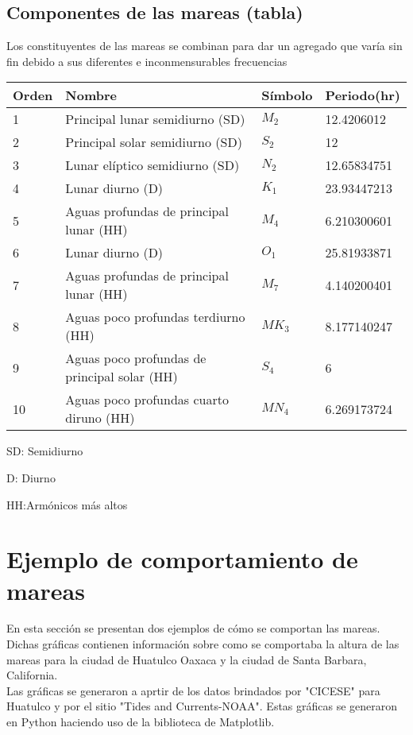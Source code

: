 \documentclass[12pt]{article}
\begin{document}
\subsection*{Componentes de las mareas (tabla)}
Los constituyentes de las mareas se combinan para dar un agregado que varía sin fin debido a sus diferentes e inconmensurables frecuencias
\begin{table}[htbp]
\begin{center}
\begin{tabular}{|l|l|l|l|}

\hline 
Orden & Nombre & Símbolo & Periodo(hr) \\
\hline \hline
1 & Principal lunar semidiurno (SD) & $M_{2}$ & 12.4206012\\ \hline
2 & Principal solar semidiurno (SD) & $S_{2}$ & 12 \\ \hline
3  & Lunar elíptico semidiurno (SD) & $N_{2}$ &12.65834751 \\ \hline
4 & Lunar diurno (D) & $K_{1}$ & 23.93447213 \\ \hline
5 & Aguas profundas de principal lunar (HH) & $M_{4}$ & 6.210300601 \\ \hline
6 & Lunar diurno (D) & $O_{1}$ & 25.81933871 \\ \hline
7 & Aguas profundas de principal lunar (HH) & $M_{7}$ & 4.140200401 \\ \hline
8 & Aguas poco profundas terdiurno (HH) & $MK_{3}$ &8.177140247 \\ \hline
9 & Aguas poco profundas de principal solar (HH) & $S_{4}$ & 6 \\ \hline
10 & Aguas poco profundas cuarto diruno (HH) & $MN_{4}$ & 6.269173724 	 \\ \hline



\end{tabular}

\end{center}
\end{table}

SD: Semidiurno

D: Diurno


HH:Armónicos más altos

\newpage
\section*{Ejemplo de comportamiento de mareas}

En esta sección se presentan dos ejemplos de cómo se comportan las mareas. Dichas gráficas contienen información sobre como se comportaba la altura de las mareas para la ciudad de Huatulco Oaxaca y la ciudad de Santa Barbara, California.\\ 
Las gráficas se generaron a aprtir de los datos brindados por "CICESE" para Huatulco y por el sitio "Tides and Currents-NOAA". Estas gráficas se generaron en Python haciendo uso de la biblioteca de Matplotlib.
\end{document}

